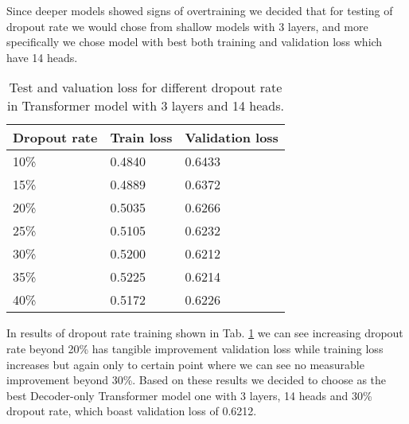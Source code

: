 Since deeper models showed signs of overtraining we decided that for testing of dropout rate we would chose from shallow models with 3 layers, and more specifically we chose model with best both training and validation loss which have 14 heads. 
\\

\begin{table}[!h]
	\centering
	\begin{tabular}{|l|l|l|}
		\hline
		Dropout rate & Train loss & Validation loss \\ \hline
		10\%         & 0.4840    & 0.6433                \\ \hline
		15\%         & 0.4889    & 0.6372                \\ \hline
		20\%         & 0.5035    & 0.6266                \\ \hline
		25\%         & 0.5105    & 0.6232                \\ \hline
		30\%         & 0.5200    & 0.6212                \\ \hline 
		35\%         & 0.5225    & 0.6214                \\ \hline
		40\%         & 0.5172    & 0.6226                \\ \hline 
	\end{tabular}
	\caption{Test and valuation loss for different dropout rate in Transformer model with 3 layers and 14 heads.}
	\label{tab:transformer_dropout}
\end{table}

In results of dropout rate training shown in Tab. \ref{tab:transformer_dropout} we can see increasing dropout rate beyond 20\% has tangible improvement validation loss while training loss increases but again only to certain point where we can see no measurable improvement beyond 30\%. Based on these results we decided to choose as the best Decoder-only Transformer model one with 3 layers, 14 heads and 30\% dropout rate, which boast validation loss of 0.6212.
\\

